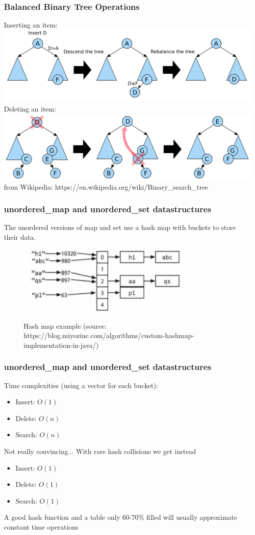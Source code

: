 \documentclass{beamer}
\begin{document}
\begin{frame}
  \frametitle{Balanced Binary Tree Operations}
  Inserting an item:
  \includegraphics[width=1.0\textwidth]{figures/binary_tree_insert.pdf}
  Deleting an item:
  \includegraphics[width=1.0\textwidth]{figures/binary_tree_delete.pdf}
  {\tiny from Wikipedia: https://en.wikipedia.org/wiki/Binary\_search\_tree}
\end{frame}

\begin{frame}
  \frametitle{unordered\_map and unordered\_set datastructures}
  The unordered versions of map and set use a hash map with buckets to store their data.
  \begin{figure}[ht]
    \includegraphics[width=0.8\textwidth]{figures/hash_map_buckets.png}
    \caption{Hash map example {\tiny (source: https://blog.miyozinc.com/algorithms/custom-hashmap-implementation-in-java/)}}
  \end{figure}
\end{frame}

\begin{frame}
  \frametitle{unordered\_map and unordered\_set datastructures}
  Time complexities (using a vector for each bucket):
  \begin{itemize}
    \item Insert: $O(1)$
    \item Delete: $O(n)$
    \item Search: $O(n)$
  \end{itemize}
  Not really convincing... With rare hash collisions we get instead
  \begin{itemize}
    \item Insert: $O(1)$
    \item Delete: $O(1)$
    \item Search: $O(1)$
  \end{itemize}
  A good hash function and a table only 60-70\% filled will usually approximate constant time operations
\end{frame}
\end{document}

